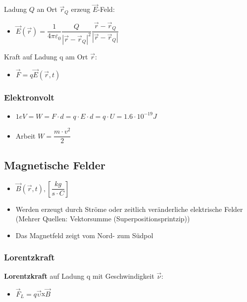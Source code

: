 \documentclass[8pt,a4paper]{scrartcl}
\begin{document}
\begin{multicols*}{3}
				Ladung $Q$ an Ort $\overrightarrow{r}_{Q}$ erzeug $\overrightarrow{E}$-Feld:		
				\begin{itemize}\itemsep0pt
					\item $\overrightarrow{E}(\overrightarrow{r}) = \dfrac{1}{4\pi\varepsilon_{0}} \dfrac{Q}{|\overrightarrow{r}-\overrightarrow{r}_{Q}|^{2}}  \dfrac{\overrightarrow{r}-\overrightarrow{r}_{Q}}{|\overrightarrow{r}-\overrightarrow{r}_{Q}|}$
					
				\end{itemize}
				Kraft auf Ladung q am Ort 
				$\overrightarrow{r}$:
				\begin{itemize}\itemsep0pt
					\item $\overrightarrow{F}=q\overrightarrow{E}(\overrightarrow{r},t)$
				\end{itemize}
			\subsubsection{Elektronvolt}
				\begin{itemize}\itemsep0pt
					\item $1 eV = W = F \cdot d =q\cdot E\cdot d=q \cdot U= 1.6\cdot10^{-19}J$
					\item Arbeit $W=\dfrac{m\cdot v^{2}}{2}$
				\end{itemize}
			\subsection{Magnetische Felder}
				\begin{itemize}\itemsep0pt
					\item $\overrightarrow{B}(\overrightarrow{r},t), [\dfrac{kg}{s\cdot C}]$
					\item Werden erzeugt durch Ströme oder zeitlich veränderliche elektrische Felder (Mehrer Quellen: Vektorsumme (Superpositionsprintzip))
					\item Das Magnetfeld zeigt vom Nord- zum Südpol
				\end{itemize}
				
				\subsubsection{Lorentzkraft}				
				
					\textbf{Lorentzkraft} auf Ladung q mit Geschwindigkeit $\overrightarrow{\nu}$:
					\begin{itemize}\itemsep0pt
						\item $\overrightarrow{F}_{L}=q\overrightarrow{\upsilon} $x$ \overrightarrow{B}$
					\end{itemize}	
					

\end{multicols*}
\end{document}
